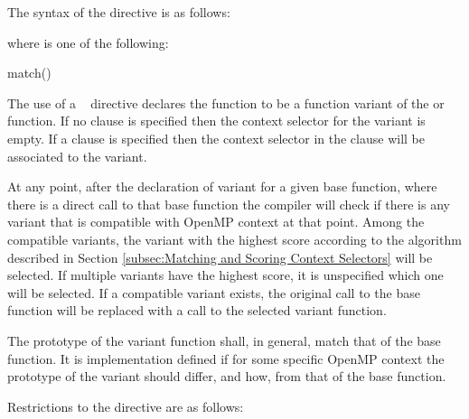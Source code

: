 \begin{fortranspecific}
The syntax of the  directive is as follows:


where  is one of the following{}:

\begin{indentedcodelist}
match()
\end{indentedcodelist}
\end{fortranspecific}

\descr

The use of a ~ directive declares the function to be a function variant of the  or  function. If no  clause is specified then the context selector for the variant is empty. If a  clause is specified then the context selector in the clause will be associated to the variant.

At any point, after the declaration of variant for a given base function, where there is a direct call to that base function the compiler will check if there is any variant that is compatible with OpenMP context at that point. Among the compatible variants, the variant with the highest score according to the algorithm described in Section \ref{subsec:Matching and Scoring Context Selectors} will be selected. If multiple variants have the highest score, it is unspecified which one will be selected. If a compatible variant exists, the original call to the base function will be replaced with a call to the selected variant function. 

The prototype of the variant function shall, in general, match that of the base function. It is implementation defined if for some specific OpenMP context the prototype of the variant should differ, and how, from that of the base function.

\restrictions
Restrictions to the  directive are as follows:

